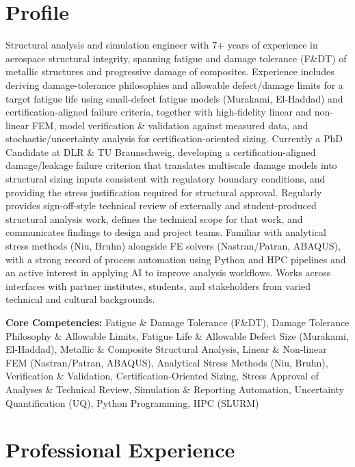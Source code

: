 \documentclass[a4paper,20pt]{article}
\begin{document}
\section{\color{blue}Profile}
Structural analysis and simulation engineer with 7+ years of experience in aerospace structural integrity, spanning fatigue and damage tolerance (F\&DT) of metallic structures and progressive damage of composites. Experience includes deriving damage-tolerance philosophies and allowable defect/damage limits for a target fatigue life using small-defect fatigue models (Murakami, El-Haddad) and certification-aligned failure criteria, together with high-fidelity linear and non-linear FEM, model verification \& validation against measured data, and stochastic/uncertainty analysis for certification-oriented sizing. Currently a PhD Candidate at DLR \& TU Braunschweig, developing a certification-aligned damage/leakage failure criterion that translates multiscale damage models into structural sizing inputs consistent with regulatory boundary conditions, and providing the stress justification required for structural approval. Regularly provides sign-off-style technical review of externally and student-produced structural analysis work, defines the technical scope for that work, and communicates findings to design and project teams. Familiar with analytical stress methods (Niu, Bruhn) alongside FE solvers (Nastran/Patran, ABAQUS), with a strong record of process automation using Python and HPC pipelines and an active interest in applying AI to improve analysis workflows. Works across interfaces with partner institutes, students, and stakeholders from varied technical and cultural backgrounds.

\vspace{0.2cm}
\textbf{Core Competencies:} Fatigue \& Damage Tolerance (F\&DT), Damage Tolerance Philosophy \& Allowable Limits, Fatigue Life \& Allowable Defect Size (Murakami, El-Haddad), Metallic \& Composite Structural Analysis, Linear \& Non-linear FEM (Nastran/Patran, ABAQUS), Analytical Stress Methods (Niu, Bruhn), Verification \& Validation, Certification-Oriented Sizing, Stress Approval of Analyses \& Technical Review, Simulation \& Reporting Automation, Uncertainty Quantification (UQ), Python Programming, HPC (SLURM)



\section{\color{blue}Professional Experience}
\end{document}
